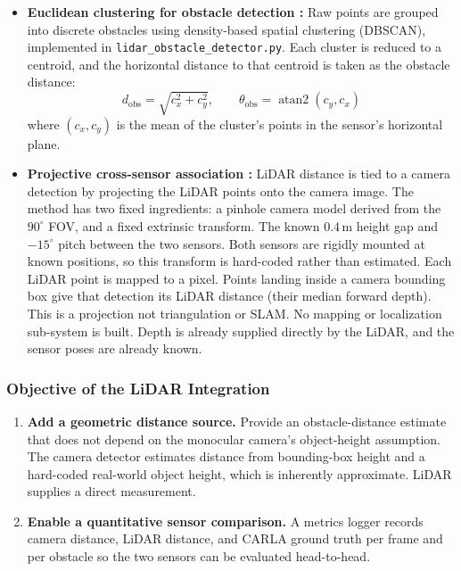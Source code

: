 \documentclass[12pt, a4paper]{report}
\begin{document}
\label{sec:tof-ref}
\begin{itemize}
    \item \textbf{Euclidean clustering for obstacle detection :} Raw points are
    grouped into discrete obstacles using density-based spatial clustering
    (DBSCAN), implemented in \texttt{lidar\_obstacle\_detector.py}. Each cluster
    is reduced to a centroid, and the horizontal distance to that centroid is
    taken as the obstacle distance:
    \begin{equation}
    d_{\text{obs}} = \sqrt{c_x^2 + c_y^2}, \qquad
    \theta_{\text{obs}} = \operatorname{atan2}(c_y, c_x)
    \label{eq:centroid}
    \end{equation}
    where $(c_x, c_y)$ is the mean of the cluster's points in the sensor's
    horizontal plane.

    \item \textbf{Projective cross-sensor association :} LiDAR distance is tied
    to a camera detection by projecting the LiDAR points onto the camera
    image. The method has two fixed
    ingredients: a pinhole camera model derived from the $90^\circ$ FOV,
    and a fixed extrinsic transform. The known $0.4$\,m height gap and
    $-15^\circ$ pitch between the two sensors. Both sensors are rigidly mounted
    at known positions, so this transform is hard-coded rather than estimated.
    Each LiDAR point is mapped to a pixel. Points landing inside a camera
    bounding box give that detection its LiDAR distance (their median forward
    depth).  This is a projection not triangulation or SLAM. No mapping or
    localization sub-system is built. Depth is
    already supplied directly by the LiDAR, and the sensor poses are already
    known.
\end{itemize}

\subsubsection{Objective of the LiDAR Integration}

\begin{enumerate}
    \item \textbf{Add a geometric distance source.} Provide an obstacle-distance
    estimate that does not depend on the monocular camera's object-height
    assumption. The camera detector estimates distance from bounding-box height
    and a hard-coded real-world object height,
    which is inherently approximate. LiDAR supplies a direct measurement.

    \item \textbf{Enable a quantitative sensor comparison.} A metrics
    logger records camera distance, LiDAR
    distance, and CARLA ground truth per frame and per obstacle so the two
    sensors can be evaluated head-to-head.
\end{enumerate}
\end{document}
